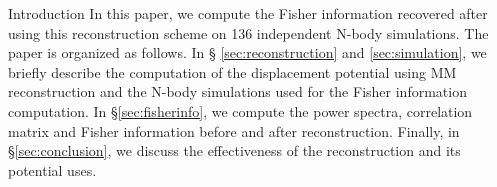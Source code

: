 \begin{section}{Introduction}
  In this paper, we compute the Fisher information recovered after
  using this reconstruction scheme on 136 independent N-body
  simulations.  The paper is organized as follows.  In \S
  \ref{sec:reconstruction} and \ref{sec:simulation}, we briefly
  describe the computation of the displacement potential using MM
  reconstruction and the N-body simulations used for the Fisher
  information computation.  In \S \ref{sec:fisherinfo}, we compute the
  power spectra, correlation matrix and Fisher information before and
  after reconstruction.  Finally, in \S \ref{sec:conclusion}, we
  discuss the effectiveness of the reconstruction and its potential
  uses.


\end{section}



